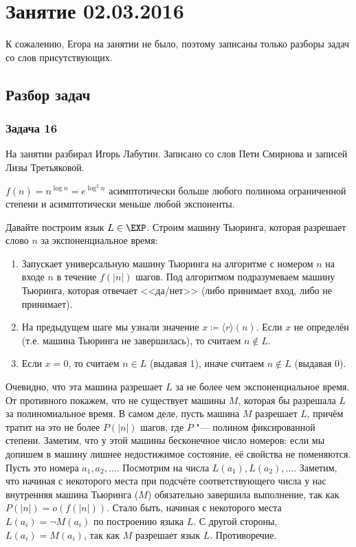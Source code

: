 \chapter{Занятие 02.03.2016}

К сожалению, Егора на занятии не было, поэтому записаны только разборы задач
со слов присутствующих.

\section{Разбор задач}
\subsection{Задача 16}\label{prob16}
	На занятии разбирал Игорь Лабутин.
	Записано со слов Пети Смирнова и записей Лизы Третьяковой.

	\begin{assertion}
		$f(n)=n^{\log n}=e^{\log^2 n}$ асимптотически больше любого полинома ограниченной степени
		и асимптотически меньше любой экспоненты.
	\end{assertion}
	Давайте построим язык $L \in \EXP$.
	Строим машину Тьюринга, которая разрешает слово $n$ за экспоненциальное время:
	\begin{enumerate}
		\item
			Запускает универсальную машину Тьюринга на алгоритме с номером $n$ на входе $n$ в течение $f(|n|)$ шагов.
			Под алгоритмом подразумеваем машину Тьюринга, которая отвечает <<да/нет>> (либо принимает вход, либо не принимает).
		\item
			На предыдущем шаге мы узнали значение $x \coloneq \langle r \rangle(n)$.
			Если $x$ не определён (т.е. машина Тьюринга не завершилась), то считаем $n \notin L$.
		\item
			Если $x=0$, то считаем $n \in L$ (выдавая 1), иначе считаем $n \notin L$ (выдавая 0).
	\end{enumerate}
	Очевидно, что эта машина разрешает $L$ за не более чем экспоненциальное время.
	От противного покажем, что не существует машины $M$, которая бы разрешала $L$ за полиномиальное время.
	В самом деле, пусть машина $M$ разрешает $L$, причём тратит на это не более $P(|n|)$ шагов,
	где $P$ "--- полином фиксированной степени.
	Заметим, что у этой машины бесконечное число номеров: если мы допишем в машину лишнее недостижимое состояние,
	её свойства не поменяются.
	Пусть это номера $a_1, a_2, \dots$.
	Посмотрим на числа $L(a_1), L(a_2), \dots$.
	Заметим, что начиная с некоторого места при подсчёте соответствующего числа у нас внутренняя машина Тьюринга ($M$)
	обязательно завершила выполнение, так как $P(|n|)=o(f(|n|))$.
	Стало быть, начиная с некоторого места $L(a_i)=\lnot M(a_i)$ по построению языка $L$.
	С другой стороны, $L(a_i)=M(a_i)$, так как $M$ разрешает язык $L$.
	Противоречие.


